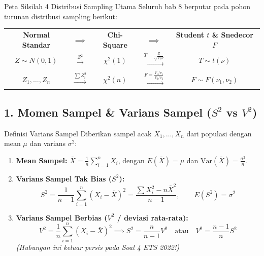\documentclass[10pt,twoside]{article}
\begin{document}
\begin{tipbox}{Peta Silsilah 4 Distribusi Sampling Utama}
Seluruh bab 8 berputar pada pohon turunan distribusi sampling berikut:
\begin{center}
\footnotesize\setlength{\tabcolsep}{3pt}
\begin{tabular}{ccccc}
\textbf{Normal Standar} & $\implies$ & \textbf{Chi-Square} & $\implies$ & \textbf{Student $t$ \& Snedecor $F$} \\
$Z \sim N(0, 1)$ & $\xrightarrow{Z^2}$ & $\chi^2(1)$ & $\xrightarrow{T = \frac{Z}{\sqrt{V/\nu}}}$ & $T \sim t(\nu)$ \\
$Z_1,\dots,Z_n$ & $\xrightarrow{\sum Z_i^2}$ & $\chi^2(n)$ & $\xrightarrow{F = \frac{V_1/\nu_1}{V_2/\nu_2}}$ & $F \sim F(\nu_1, \nu_2)$
\end{tabular}
\end{center}
\end{tipbox}

\subsection{1. Momen Sampel \& Varians Sampel ($S^2$ vs $V^2$)}
\begin{teoribox}{Definisi Varians Sampel}
Diberikan sampel acak $X_1, \dots, X_n$ dari populasi dengan mean $\mu$ dan varians $\sigma^2$:
\begin{enumerate}
  \item \textbf{Mean Sampel:} $\bar{X} = \frac{1}{n}\sum_{i=1}^n X_i$, dengan $E(\bar{X}) = \mu$ dan $\mathrm{Var}(\bar{X}) = \frac{\sigma^2}{n}$.
  \item \textbf{Varians Sampel Tak Bias ($S^2$):}
    \begin{equation*}
      S^2 = \frac{1}{n-1} \sum_{i=1}^n (X_i - \bar{X})^2 = \frac{\sum X_i^2 - n\bar{X}^2}{n-1}, \qquad E(S^2) = \sigma^2
    \end{equation*}
  \item \textbf{Varians Sampel Berbias ($V^2$ / deviasi rata-rata):}
    \begin{equation*}
      V^2 = \frac{1}{n}\sum_{i=1}^n (X_i - \bar{X})^2 \implies S^2 = \frac{n}{n-1}V^2 \quad \text{atau} \quad V^2 = \frac{n-1}{n}S^2
    \end{equation*}
    \textit{(Hubungan ini keluar persis pada Soal 4 ETS 2022!)}
\end{enumerate}
\end{teoribox}
\end{document}
